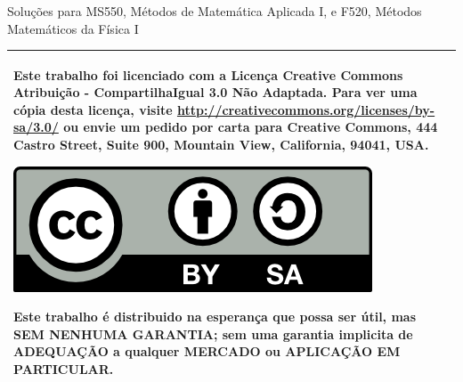 % 
% 
% 
% 
% 
% 
%
%
\begin{center}
    \LARGE{Solu\c{c}\~{o}es para MS550, M\'{e}todos de Matem\'{a}tica Aplicada I, e F520, M\'{e}todos Matem\'{a}ticos da F\'{i}sica I}
    
    \Large{\mycheader}
\end{center}
\vspace{.5\textheight}

\begin{tabular}{|p{}|}
\hline
Este trabalho foi licenciado com a Licen\c{c}a Creative Commons Atribui\c{c}\~{a}o - CompartilhaIgual 3.0 N\~{a}o Adaptada. Para ver uma c\'{o}pia desta licen\c{c}a, visite \url{http://creativecommons.org/licenses/by-sa/3.0/} ou envie um pedido por carta para Creative Commons, 444 Castro Street, Suite 900, Mountain View, California, 94041, USA.
\begin{center}
\includegraphics[scale=1]{cc-by-sa.png}
\end{center}
Este trabalho \'{e} distribuido na esperança que possa ser \'{u}til, mas SEM NENHUMA GARANTIA; sem uma garantia implicita de ADEQUA\c{C}\~{A}O a qualquer MERCADO ou APLICA\c{C}\~{A}O EM PARTICULAR.
\\ \hline
\end{tabular}
